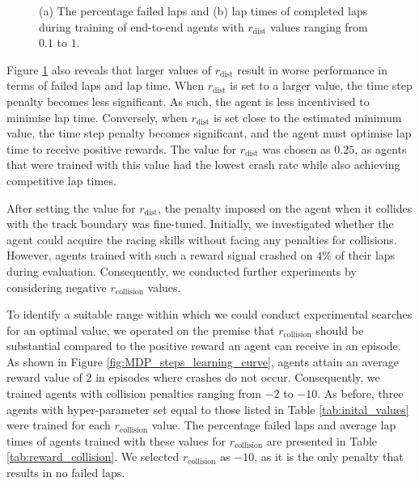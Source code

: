 \begin{figure}[htb!]
    \centering
    
    \caption[Learning curves of agents with different values for $r_{\text{dist}}$ during training]{(a) The percentage failed laps and (b) lap times of completed laps during training of end-to-end agents with $r_{\text{dist}}$ values ranging from $0.1$ to $1$.}
    \label{fig:reward_signal_dist}
\end{figure}


Figure \ref{fig:reward_signal_dist} also reveals that larger values of $r_{\text{dist}}$ result in worse performance in terms of failed laps and lap time.
When $r_{\text{dist}}$ is set to a larger value, the time step penalty becomes less significant.
As such, the agent is less incentivised to minimise lap time.
Conversely, when $r_{\text{dist}}$ is set close to the estimated minimum value, the time step penalty becomes significant, and the agent must optimise lap time to receive positive rewards.
The value for $r_{\text{dist}}$ was chosen as $0.25$, as agents that were trained with this value had the lowest crash rate while also achieving competitive lap times.


After setting the value for $r_{\text{dist}}$, the penalty imposed on the agent when it collides with the track boundary was fine-tuned. 
Initially, we investigated whether the agent could acquire the racing skills without facing any penalties for collisions. 
However, agents trained with such a reward signal crashed on $4\%$ of their laps during evaluation. 
Consequently, we conducted further experiments by considering negative $r_{\text{collision}}$ values.

To identify a suitable range within which we could conduct experimental searches for an optimal value, we operated on the premise that $r_{\text{collision}}$ should be substantial compared to the positive reward an agent can receive in an episode. 
As shown in Figure \ref{fig:MDP_steps_learning_curve}, agents attain an average reward value of $2$ in episodes where crashes do not occur. 
Consequently, we trained agents with collision penalties ranging from $-2$ to $-10$.
As before, three agents with hyper-parameter set equal to those listed in Table \ref{tab:inital_values} were trained for each $r_{\text{collision}}$ value.
The percentage failed laps and average lap times of agents trained with these values for $r_{\text{collision}}$ are presented in Table \ref{tab:reward_collision}.
We selected $r_{\text{collision}}$ as $-10$, as it is the only penalty that results in no failed laps.

